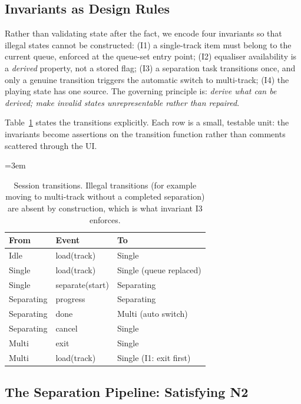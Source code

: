 \documentclass[letterpaper]{article} %
\newcommand{\nohyph}{\hyphenpenalty=10000 \exhyphenpenalty=10000 \tolerance=10000 \emergencystretch=3em}
\begin{document}
\subsection{Invariants as Design Rules}

Rather than validating state after the fact, we encode four invariants so that
illegal states cannot be constructed: (I1) a single-track item must belong to
the current queue, enforced at the queue-set entry point; (I2) equaliser
availability is a \emph{derived} property, not a stored flag; (I3) a separation
task transitions once, and only a genuine transition triggers the automatic
switch to multi-track; (I4) the playing state has one source. The governing
principle is: \emph{derive what can be derived; make invalid states
unrepresentable rather than repaired}.

Table~\ref{tab:sm} states the transitions explicitly. Each row is a small,
testable unit: the invariants become assertions on the transition function
rather than comments scattered through the UI.

\begin{table}[t]
\begingroup
\centering
\footnotesize
\nohyph
\setlength{\tabcolsep}{3pt}
\begin{tabular}{@{}l l l@{}}
\hline
\textbf{From} & \textbf{Event} & \textbf{To} \\
\hline
Idle        & load(track)        & Single \\
Single      & load(track)        & Single (queue replaced) \\
Single      & separate(start)    & Separating \\
Separating  & progress           & Separating \\
Separating  & done               & Multi (auto switch) \\
Separating  & cancel             & Single \\
Multi       & exit               & Single \\
Multi       & load(track)        & Single (I1: exit first) \\
\hline
\end{tabular}
\caption{Session transitions. Illegal transitions (for example moving to
multi-track without a completed separation) are absent by construction, which
is what invariant I3 enforces.}
\label{tab:sm}
\endgroup
\end{table}

\subsection{The Separation Pipeline: Satisfying N2}\label{sec:pipeline}
\end{document}
